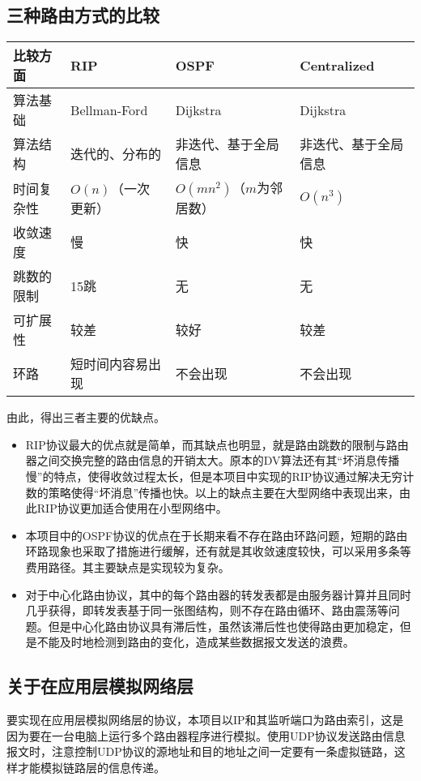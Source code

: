\documentclass[15pt]{ctexart}
\begin{document}
	\subsection{三种路由方式的比较} %
	\label{sub:三种路由方式的比较}
		\begin{table}[H]
			\centering
			\begin{tabular}{|l|l|l|l|}
				\hline
				比较方面 & RIP & OSPF & Centralized \\
				\hline
				算法基础 & Bellman-Ford & Dijkstra & Dijkstra \\
				\hline
				算法结构 & 迭代的、分布的 & 非迭代、基于全局信息 &  非迭代、基于全局信息\\
				\hline
				时间复杂性 & $O(n)$（一次更新） & $O(mn^2)$（$m$为邻居数） & $O(n^3)$ \\
				\hline
				收敛速度 & 慢 & 快 & 快 \\
				\hline
				跳数的限制 & 15跳 & 无 & 无 \\
				\hline
				可扩展性 & 较差 & 较好 & 较差 \\
				\hline
				环路 & 短时间内容易出现 & 不会出现 & 不会出现 \\
				\hline
			\end{tabular}
		\end{table}
		由此，得出三者主要的优缺点。
		\begin{itemize}
			\item RIP协议最大的优点就是简单，而其缺点也明显，就是路由跳数的限制与路由器之间交换完整的路由信息的开销太大。原本的DV算法还有其“坏消息传播慢”的特点，使得收敛过程太长，但是本项目中实现的RIP协议通过解决无穷计数的策略使得“坏消息”传播也快。以上的缺点主要在大型网络中表现出来，由此RIP协议更加适合使用在小型网络中。
			\item 本项目中的OSPF协议的优点在于长期来看不存在路由环路问题，短期的路由环路现象也采取了措施进行缓解，还有就是其收敛速度较快，可以采用多条等费用路径。其主要缺点是实现较为复杂。
			\item 对于中心化路由协议，其中的每个路由器的转发表都是由服务器计算并且同时几乎获得，即转发表基于同一张图结构，则不存在路由循环、路由震荡等问题。但是中心化路由协议具有滞后性，虽然该滞后性也使得路由更加稳定，但是不能及时地检测到路由的变化，造成某些数据报文发送的浪费。
		\end{itemize}
	\subsection{关于在应用层模拟网络层} %
	\label{sub:关于在应用层模拟网络层协议}
		要实现在应用层模拟网络层的协议，本项目以IP和其监听端口为路由索引，这是因为要在一台电脑上运行多个路由器程序进行模拟。使用UDP协议发送路由信息报文时，注意控制UDP协议的源地址和目的地址之间一定要有一条虚拟链路，这样才能模拟链路层的信息传递。
\end{document}

